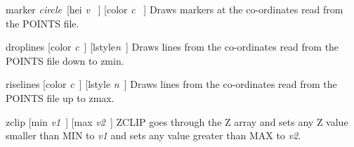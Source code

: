\begin{commanddescription}
\item[{\sf marker {\it circle}\  [hei {\it v} \ ] [color {\it c} \ ]}]
Draws markers at the co-ordinates read from the {\sf POINTS} file.

\item[{\sf droplines [color {\it c}\ ] [lstyle{\it n}\ ] }]
Draws lines from the co-ordinates read from the {\sf POINTS} file
down to zmin.

\item[{\sf riselines [color {\it c}\ ] [lstyle {\it n}\ ]}]
Draws lines from the co-ordinates read from the {\sf POINTS} file
up to zmax.

\item[{\sf zclip  [min {\it v1}\ ]  [max {\it v2}\ ] }]
{\sf ZCLIP} goes through the Z array and sets any Z value smaller
than {\sf MIN} to {\it v1} and sets any value greater 
than {\sf MAX} to {\it v2}.

\end{commanddescription}
